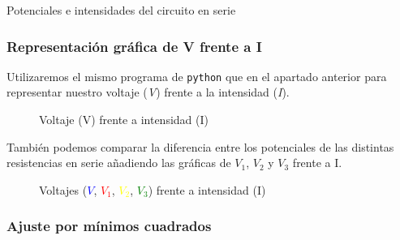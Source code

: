 \documentclass[12pt, a4paper, titlepage]{article}
\newcommand{\code}[1]{\texttt{#1}} %
\begin{document}
  \begin{table}[H]
  \centering
  \caption{Potenciales e intensidades del circuito en serie}
  \end{table}

  \subsubsection{Representación gráfica de V frente a I}

  Utilizaremos el mismo programa de \code{python} que en el apartado anterior para representar nuestro voltaje (\textit{V}) frente a la intensidad (\textit{I}).

  \begin{figure}[H]
    \hspace{2.5em} 
    \caption{Voltaje (V) frente a intensidad (I)}
  \end{figure}

  También podemos comparar la diferencia entre los potenciales de las distintas resistencias en serie añadiendo las gráficas de $V_1$, $V_2$ y $V_3$ frente a I.

  \begin{figure}[H]
    \hspace{2.5em} 
    \caption{Voltajes (\textcolor{Blue}{$V$}, \textcolor{Red}{$V_1$}, \textcolor{Yellow}{$V_2$}, \textcolor{Green}{$V_3$}) frente a intensidad (I)}
  \end{figure}

  \subsubsection{Ajuste por mínimos cuadrados}
\end{document}
